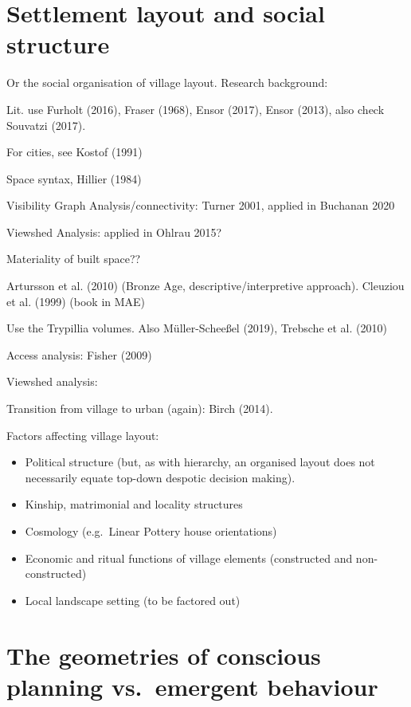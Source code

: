 \documentclass[
  12pt,
]{book}
\begin{document}
\hypertarget{settlement-layout-and-social-structure}{%
\section{Settlement layout and social structure}\label{settlement-layout-and-social-structure}}

Or the social organisation of village layout. Research background:

Lit. use Furholt (2016), Fraser (1968), Ensor (2017), Ensor (2013), also check Souvatzi (2017).

For cities, see Kostof (1991)

Space syntax, Hillier (1984)

Visibility Graph Analysis/connectivity: Turner 2001, applied in Buchanan 2020

Viewshed Analysis: applied in Ohlrau 2015?

Materiality of built space??

Artursson et al. (2010) (Bronze Age, descriptive/interpretive approach). Cleuziou et al. (1999) (book in MAE)

Use the Trypillia volumes. Also Müller-Scheeßel (2019), Trebsche et al. (2010)

Access analysis: Fisher (2009)

Viewshed analysis:

Transition from village to urban (again): Birch (2014).

Factors affecting village layout:

\begin{itemize}
\item
  Political structure (but, as with hierarchy, an organised layout does not necessarily equate top-down despotic decision making).
\item
  Kinship, matrimonial and locality structures
\item
  Cosmology (e.g.~Linear Pottery house orientations)
\item
  Economic and ritual functions of village elements (constructed and non-constructed)
\item
  Local landscape setting (to be factored out)
\end{itemize}

\hypertarget{the-geometries-of-conscious-planning-vs.-emergent-behaviour}{%
\section{The geometries of conscious planning vs.~emergent behaviour}\label{the-geometries-of-conscious-planning-vs.-emergent-behaviour}}
\end{document}
